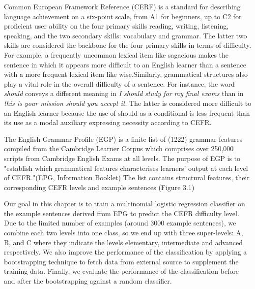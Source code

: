 Common European Framework Reference (CERF) is a standard for describing language achievement on a six-point scale, from A1 for beginners, up to C2 for proficient user ability on the four primary skills reading, writing, listening, speaking, and the two secondary skills: vocabulary and grammar. The latter two skills are considered the backbone for the four primary skills in terms of difficulty. For example, a frequently uncommon lexical item like sagacious makes the sentence in which it appears more difficult to an English learner than a sentence with a more frequent lexical item like wise.Similarly, grammatical structures also play a vital role in the overall difficulty of a sentence. For instance, the word \emph{should} conveys a different meaning in \emph{I should study for my final exams} than in \emph{this is your mission should you accept it}. The latter is considered more difficult to an English learner because the use of should as a conditional is less frequent than its use as a modal auxiliary expressing necessity according to CEFR. 

The English Grammar Profile (EGP) \citep{o2017english} is a finite list of (1222) grammar features compiled from the Cambridge Learner Corpus which comprises over 250,000 scripts from Cambridge English Exams at all levels. The purpose of EGP is to "establish which grammatical features characterises learners' output at each level of CEFR."(EPG, Information Booklet) The list contains structural features, their corresponding CEFR levels and example sentences (Figure 3.1)

Our goal in this chapter is to train a multinomial logistic regression classifier on the example sentences derived from EPG to predict the CEFR difficulty level. Due to the limited number of examples (around 3000 example sentences), we combine each two levels into one class, so we end up with three super-levels: A, B, and C where they indicate the levels elementary, intermediate and advanced respectively. We also improve the performance of the classification by applying a bootstrapping technique \citep{yarowsky_unsupervised_1995} to fetch data from external source to supplement the training data. Finally, we evaluate the performance of the classification before and after the bootstrapping against a random classifier.

